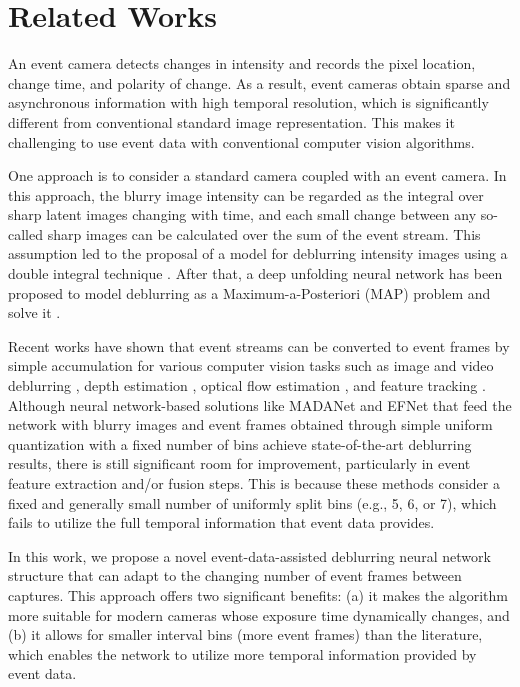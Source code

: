 \documentclass{article}
\begin{document}
\section{Related Works}
An event camera detects changes in intensity and records the pixel location, change time, and polarity of change. As a result, event cameras obtain sparse and asynchronous information with high temporal resolution, which is significantly different from conventional standard image representation. This makes it challenging to use event data with conventional computer vision algorithms.

One approach is to consider a standard camera coupled with an event camera. In this approach, the blurry image intensity can be regarded as the integral over sharp latent images changing with time, and each small change between any so-called sharp images can be calculated over the sum of the event stream. This assumption led to the proposal of a model for deblurring intensity images using a double integral technique \cite{BHA}.
After that, a deep unfolding neural network has been proposed to model deblurring as a Maximum-a-Posteriori (MAP) problem and solve it \cite{LEBMD}. 

Recent works have shown that event streams can be converted to event frames by simple accumulation for various computer vision tasks such as image and video deblurring \cite{MADANet, EFNet}, depth estimation \cite{depthevent}, optical flow estimation \cite{opticalflow}, and feature tracking \cite{tracking}. Although neural network-based solutions like MADANet and EFNet \cite{MADANet, EFNet} that feed the network with blurry images and event frames obtained through simple uniform quantization with a fixed number of bins achieve state-of-the-art deblurring results, there is still significant room for improvement, particularly in event feature extraction and/or fusion steps. This is because these methods consider a fixed and generally small number of uniformly split bins (e.g., 5, 6, or 7), which fails to utilize the full temporal information that event data provides.

In this work, we propose a novel event-data-assisted deblurring neural network structure that can adapt to the changing number of event frames between captures. This approach offers two significant benefits: (a) it makes the algorithm more suitable for modern cameras whose exposure time dynamically changes, and (b) it allows for smaller interval bins (more event frames) than the literature, which enables the network to utilize more temporal information provided by event data. 
\end{document}
